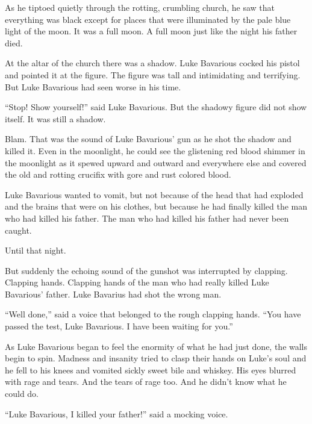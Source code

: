 As he tiptoed quietly through the rotting, crumbling church, he saw
that everything was black except for places that were illuminated
by the pale blue light of the moon. It was a full moon. A full moon
just like the night his father died.



At the altar of the church there was a shadow. Luke Bavarious
cocked his pistol and pointed it at the figure. The figure was tall
and intimidating and terrifying. But Luke Bavarious had seen worse
in his time.



``Stop! Show yourself!'' said Luke Bavarious. But the
shadowy figure did not show itself. It was still a shadow.



Blam. That was the sound of Luke Bavarious' gun as he shot
the shadow and killed it. Even in the moonlight, he could see the
glistening red blood shimmer in the moonlight as it spewed upward
and outward and everywhere else and covered the old and rotting
crucifix with gore and rust colored blood.



Luke Bavarious wanted to vomit, but not because of the head that
had exploded and the brains that were on his clothes, but because
he had finally killed the man who had killed his father. The man
who had killed his father had never been caught.



Until that night.



But suddenly the echoing sound of the gunshot was interrupted by
clapping. Clapping hands. Clapping hands of the man who had really
killed Luke Bavarious' father. Luke Bavarius had shot the
wrong man.



``Well done,'' said a voice that belonged to the rough
clapping hands. ``You have passed the test, Luke Bavarious. I
have been waiting for you.''



As Luke Bavarious began to feel the enormity of what he had just
done, the walls begin to spin. Madness and insanity tried to clasp
their hands on Luke's soul and he fell to his knees and
vomited sickly sweet bile and whiskey. His eyes blurred with rage
and tears. And the tears of rage too. And he didn't know what
he could do.



``Luke Bavarious, I killed your father!'' said a mocking
voice.



